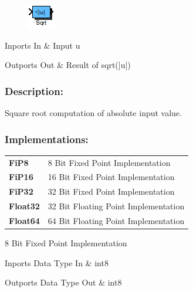 \label{block:Sqrt}
\begin{figure}[H]\includegraphics{Sqrt}\end{figure} 

\begin{XtoCtabular}{Inports}
In & Input u\tabularnewline
\hline
\end{XtoCtabular}


\begin{XtoCtabular}{Outports}
Out & Result of sqrt(|u|)\tabularnewline
\hline
\end{XtoCtabular}

\subsubsection*{Description:}
Square root computation of absolute input value.


\subsubsection*{Implementations:}
\begin{tabular}{l l}
\textbf{FiP8} & 8 Bit Fixed Point Implementation\tabularnewline
\textbf{FiP16} & 16 Bit Fixed Point Implementation\tabularnewline
\textbf{FiP32} & 32 Bit Fixed Point Implementation\tabularnewline
\textbf{Float32} & 32 Bit Floating Point Implementation\tabularnewline
\textbf{Float64} & 64 Bit Floating Point Implementation\tabularnewline
\end{tabular}

\nopagebreak[0]

8 Bit Fixed Point Implementation

\begin{XtoCtabular}{Inports Data Type}
In & int8\tabularnewline
\hline
\end{XtoCtabular}

\begin{XtoCtabular}{Outports Data Type}
Out & int8\tabularnewline
\hline
\end{XtoCtabular}

\ifdefined \AddTestReports
{}
\fi
{}
\nopagebreak[0]

